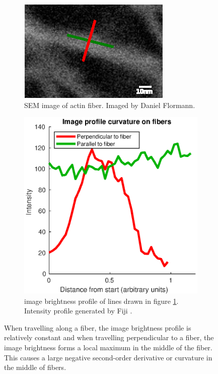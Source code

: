 \documentclass[12pt,english,twocolumn]{revtex4}
\begin{document}
\begin{figure}[h]
    \centering
    \begin{subfigure}[b]{\linewidth}
        \includegraphics[width=.9\linewidth]{figures/curvatur_real_fibre.eps}
        \caption{SEM image of actin fiber. Imaged by Daniel Flormann.}
        \label{subfig:profile_img}
    \end{subfigure}
    \begin{subfigure}[b]{\linewidth}
        \includegraphics[width=.9\linewidth]{figures/curvature2.eps}
        \caption{image brightness profile of lines drawn in figure \ref{subfig:profile_img}.\\
        Intensity profile generated by Fiji \cite{fiji}.}
    \end{subfigure}
    \caption{When travelling along a fiber, the image brightness profile is relatively constant and when travelling perpendicular to a fiber, the image brightness forms a local maximum in the middle of the fiber. This causes a large negative second-order derivative or curvature in the middle of fibers.}
    \label{fig:curvature_example}
\end{figure}
\end{document}

